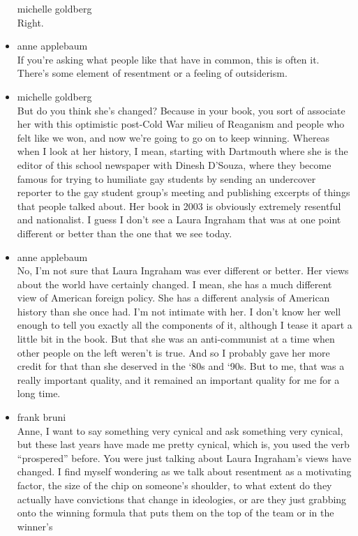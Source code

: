 \begin{itemize}
  michelle goldberg\\
  Right.
\item
  anne applebaum\\
  If you're asking what people like that have in common, this is often
  it. There's some element of resentment or a feeling of outsiderism.
\item
  michelle goldberg\\
  But do you think she's changed? Because in your book, you sort of
  associate her with this optimistic post-Cold War milieu of Reaganism
  and people who felt like we won, and now we're going to go on to keep
  winning. Whereas when I look at her history, I mean, starting with
  Dartmouth where she is the editor of this school newspaper with Dinesh
  D'Souza, where they become famous for trying to humiliate gay students
  by sending an undercover reporter to the gay student group's meeting
  and publishing excerpts of things that people talked about. Her book
  in 2003 is obviously extremely resentful and nationalist. I guess I
  don't see a Laura Ingraham that was at one point different or better
  than the one that we see today.
\item
  anne applebaum\\
  No, I'm not sure that Laura Ingraham was ever different or better. Her
  views about the world have certainly changed. I mean, she has a much
  different view of American foreign policy. She has a different
  analysis of American history than she once had. I'm not intimate with
  her. I don't know her well enough to tell you exactly all the
  components of it, although I tease it apart a little bit in the book.
  But that she was an anti-communist at a time when other people on the
  left weren't is true. And so I probably gave her more credit for that
  than she deserved in the `80s and `90s. But to me, that was a really
  important quality, and it remained an important quality for me for a
  long time.
\item
  frank bruni\\
  Anne, I want to say something very cynical and ask something very
  cynical, but these last years have made me pretty cynical, which is,
  you used the verb ``prospered'' before. You were just talking about
  Laura Ingraham's views have changed. I find myself wondering as we
  talk about resentment as a motivating factor, the size of the chip on
  someone's shoulder, to what extent do they actually have convictions
  that change in ideologies, or are they just grabbing onto the winning
  formula that puts them on the top of the team or in the winner's

\end{itemize}
